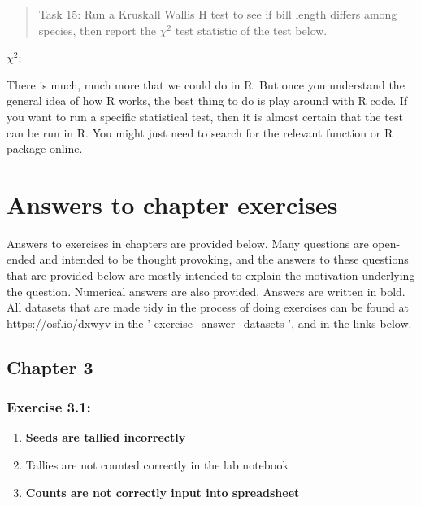 \documentclass[
]{scrbook}
\providecommand{\tightlist}{%
  \setlength{\itemsep}{0pt}\setlength{\parskip}{0pt}}
\begin{document}
\begin{quote}
Task 15: Run a Kruskall Wallis H test to see if bill length differs among species, then report the \(\chi^{2}\) test statistic of the test below.
\end{quote}

\(\chi^{2}\): \_\_\_\_\_\_\_\_\_\_\_\_\_\_\_\_\_\_\_

There is much, much more that we could do in R.
But once you understand the general idea of how R works, the best thing to do is play around with R code.
If you want to run a specific statistical test, then it is almost certain that the test can be run in R.
You might just need to search for the relevant function or R package online.

\hypertarget{appendix-appendix}{%
\appendix}


\hypertarget{appendexA}{%
\chapter{Answers to chapter exercises}\label{appendexA}}

Answers to exercises in chapters are provided below.
Many questions are open-ended and intended to be thought provoking, and the answers to these questions that are provided below are mostly intended to explain the motivation underlying the question.
Numerical answers are also provided.
Answers are written in bold.
All datasets that are made tidy in the process of doing exercises can be found at \url{https://osf.io/dxwyv} in the ' exercise\_answer\_datasets ', and in the links below.

\hypertarget{chapter-3}{%
\section{Chapter 3}\label{chapter-3}}

\hypertarget{exercise-3.1}{%
\subsection{Exercise 3.1:}\label{exercise-3.1}}

\begin{enumerate}
\def\labelenumi{\arabic{enumi}.}
\tightlist
\item
  \textbf{Seeds are tallied incorrectly}
\item
  Tallies are not counted correctly in the lab notebook
\item
  \textbf{Counts are not correctly input into spreadsheet}
\end{enumerate}
\end{document}

